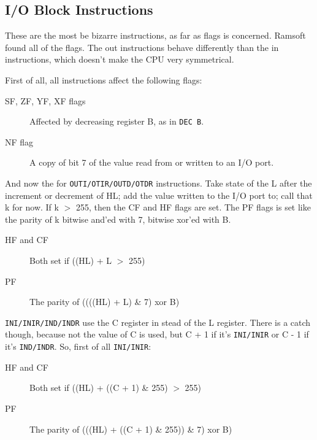 \documentclass[twoside,openright,a4paper]{book}
\begin{document}
\subsection{I/O Block Instructions}
\label{block_io}

These are the most be bizarre instructions, as far as flags is concerned. Ramsoft found all of the flags. The out instructions behave differently than the in instructions, which doesn't make the CPU very symmetrical. 

First of all, all instructions affect the following flags:

\begin{description}

	\item[SF, ZF, YF, XF flags]
	Affected by decreasing register B, as in {\tt DEC B}.

	\item[NF flag]
	A copy of bit 7 of the value read from or written to an I/O port.

\end{description}

And now the for {\tt OUTI/OTIR/OUTD/OTDR} instructions. Take state of the L after the increment or decrement of HL; add the value written to the I/O port to; call that k for now. If k $>$ 255, then the CF and HF flags are set. The PF flags is set like the parity of k bitwise and'ed with 7, bitwise xor'ed with B.

\begin{description}

	\item[HF and CF]
	Both set if ((HL) + L  $>$ 255)

	\item[PF]
	The parity of ((((HL) + L) \& 7) xor B)

\end{description}

{\tt INI/INIR/IND/INDR} use the C register in stead of the L register. There is a catch though, because not the value of C is used, but C + 1 if it's {\tt INI/INIR} or C - 1 if it's {\tt IND/INDR}. So, first of all {\tt INI/INIR}:

\begin{description}

	\item[HF and CF]
	Both set if ((HL) + ((C + 1) \& 255)  $>$ 255)

	\item[PF]
	The parity of (((HL) + ((C + 1) \& 255)) \& 7) xor B)

\end{description}
\end{document}
